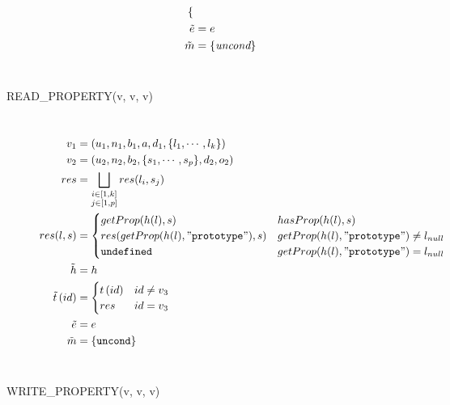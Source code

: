 \begin{description}
\[\begin{aligned}
\begin{cases}
      \end{cases}\\
    \tilde{e} &= e \\
    \tilde{m} &= \{\emph{uncond}\} \\
  \end{aligned}
  \]
  \\
  \item[{\small\ttfamily READ\_PROPERTY(v\ts{1}, v\ts{2}, v\ts{3})}] ~\\%
  \[
  \begin{aligned}
    v_1 &= (u_1, n_1, b_1, a, d_1, \{l_1, \cdots, l_k\}) \\
    v_2 &= (u_2, n_2, b_2, \{s_1, \cdots, s_p\}, d_2, o_2) \\
    res &= \bigsqcup_{\substack{i\in[1,k] \\ j\in[1,p]}} res(l_i, s_j) \\
    res(l, s) &= \begin{cases}
      getProp(h(l), s) & hasProp(h(l), s) \\
      res(getProp(h(l), \mathtt{"prototype"}), s) & getProp(h(l),
      \mathtt{"prototype"})
      \neq l_{null}\\
      \mathtt{undefined} & getProp(h(l), \mathtt{"prototype"}) = l_{null}\\
    \end{cases} \\
    \tilde{h} &= h \\ 
    \tilde{t}\left( id \right) &= 
      \begin{cases}
	 t\left( id \right) & id \neq v_3 \\
	 res & id = v_3 \\
      \end{cases} \\ 
    \tilde{e} &= e \\ 
  \tilde{m} &= \{\mathtt{uncond}\} \\
  \end{aligned}
  \]
  \\
  \item[{\small\ttfamily WRITE\_PROPERTY(v\ts{1}, v\ts{2}, v\ts{3})}] ~\\%
  \[
  \begin{aligned}

\end{aligned}\]
\end{description}
